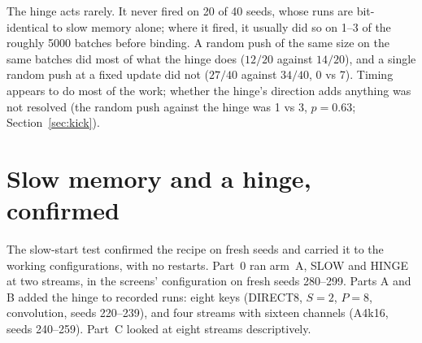 \documentclass[11pt]{article}
\newcommand{\arm}[1]{\textsf{#1}}
\begin{document}
The hinge acts rarely. It never fired on 20 of 40 seeds, whose runs are bit-identical to slow memory alone; where it fired, it usually did so on 1--3 of the roughly 5000 batches before binding. A random push of the same size on the same batches did most of what the hinge does ($12/20$ against $14/20$), and a single random push at a fixed update did not ($27/40$ against $34/40$, 0 vs 7). Timing appears to do most of the work; whether the hinge's direction adds anything was not resolved (the random push against the hinge was 1 vs 3, $p = 0.63$; Section~\ref{sec:kick}).

\section{Slow memory and a hinge, confirmed}
\label{sec:slowstart}

The slow-start test confirmed the recipe on fresh seeds and carried it to the working configurations, with no restarts. Part~0 ran arm~\arm{A}, SLOW and HINGE at two streams, in the screens' configuration on fresh seeds 280--299. Parts A and B added the hinge to recorded runs: eight keys (\arm{DIRECT8}, $S = 2$, $P = 8$, convolution, seeds 220--239), and four streams with sixteen channels (\arm{A4k16}, seeds 240--259). Part~C looked at eight streams descriptively.
\end{document}
